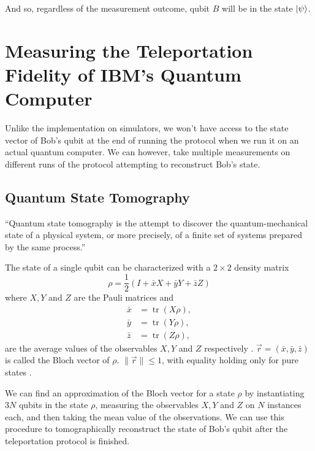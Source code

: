 \documentclass[prx,twocolumn]{revtex4-2}
\numberwithin{equation}{section}
\numberwithin{figure}{section}
\numberwithin{table}{section}
\DeclareMathOperator{\tr}{tr}
\begin{document}
And so, regardless of the measurement outcome, qubit $B$ will be in the state $\ket\psi$. 

\section{Measuring the Teleportation Fidelity of IBM's Quantum Computer}
Unlike the implementation on simulators, we won't have access to the state vector of Bob's qubit at the end 
of running the protocol when we run it on an actual quantum computer. We can however, take multiple 
measurements on different runs of the protocol attempting to reconstruct Bob's state.
\subsection{Quantum State Tomography}
``Quantum state tomography is the attempt to discover the quantum-mechanical state of a physical system, or
more precisely, of a finite set of systems prepared by the same process.'' \cite{tomography}

The state of a single qubit can be characterized with a $2\times 2$ density matrix
\begin{equation}
    \rho = \frac{1}{2} (I + \bar{x} X + \bar{y} Y + \bar{z} Z)
\end{equation}
where $X, Y$ and $Z$ are the Pauli matrices and 
\begin{equation}
    \begin{aligned}
        \bar{x} &= \tr(X\rho), \\
        \bar{y} &= \tr(Y\rho), \\
        \bar{z} &= \tr(Z\rho),
    \end{aligned}
\end{equation}
are the average values of the observables $X,Y$ and $Z$ respectively \cite{nielsen-chuang}.
$\vec{r} = (\bar{x},\bar{y},\bar{z})$ is called the Bloch vector of $\rho$. 
$\|\vec{r}\| \leq 1$, with equality holding only for pure states \cite{nielsen-chuang}.

We can find an approximation of the Bloch vector for a state $\rho$ by instantiating $3N$ qubits in the state 
$\rho$, measuring the observables $X, Y$ and $Z$ on $N$ instances each, and then taking the mean value of the 
observations. We can use this procedure to tomographically reconstruct the state of Bob's qubit after the 
teleportation protocol is finished.
\end{document}
